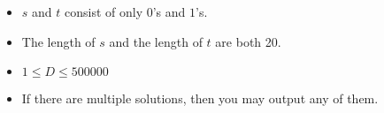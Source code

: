 \begin{itemize}
\tightlist
\item $s$ and $t$ consist of only $0$'s and $1$'s.
\item The length of $s$ and the length of $t$ are both 20.
\item $1\le D\le 500000$
\item If there are multiple solutions, then you may output any of them.
\end{itemize}
\newpage
